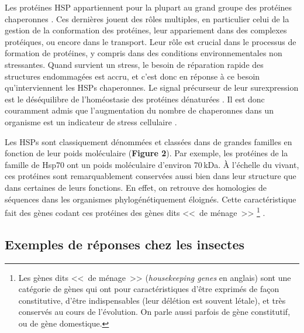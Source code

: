 	Les protéines HSP appartiennent pour la plupart au grand groupe des protéines chaperonnes \cite{federhoffmann1999}.
	Ces dernières jouent des rôles multiples, en particulier celui de la gestion de la conformation des protéines, leur appariement dans des complexes protéiques, ou encore dans le transport.
	Leur rôle est crucial dans le processus de formation de protéines, y compris dans des conditions environnementales non stressantes.
	Quand survient un stress, le besoin de réparation rapide des structures endommagées est accru, et c'est donc en réponse à ce besoin qu'interviennent les HSPs chaperonnes.
	Le signal précurseur de leur surexpression est le déséquilibre de l'homéostasie des protéines dénaturées \cite{ananthan1986}.
	Il est donc couramment admis que l'augmentation du nombre de chaperonnes dans un organisme est un indicateur de stress cellulaire \cite{ryan1996}.

	Les HSPs sont classiquement dénommées et classées dans de grandes familles en fonction de leur poids moléculaire (\textbf{Figure 2}).
	Par exemple, les protéines de la famille de Hsp70 ont un poids moléculaire d'environ 70\,kDa.
	À l'échelle du vivant, ces protéines sont remarquablement conservées aussi bien dans leur structure que dans certaines de leurs fonctions.
	En effet, on retrouve des homologies de séquences dans les organismes phylogénétiquement éloignés.
	Cette caractéristique fait des gènes codant ces protéines des gènes dits <<~de ménage~>>%
\footnote{Les gènes dits <<~de ménage~>> (\textit{housekeeping genes} en anglais) sont une catégorie de gènes qui ont pour caractéristiques d'être exprimés de façon constitutive, d'être indispensables (leur délétion est souvent létale), et très conservés au cours de l'évolution. On parle aussi parfois de gène constitutif, ou de gène domestique.} \cite{gupta1995}.



	\subsection{Exemples de réponses chez les insectes}


